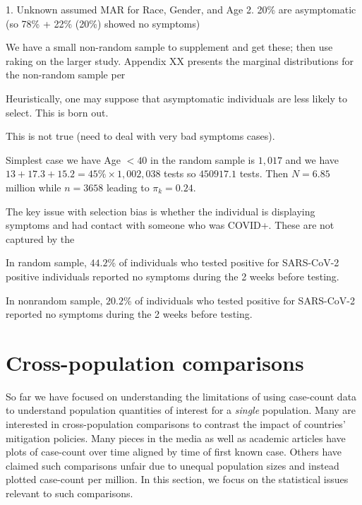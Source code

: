 \documentclass[11pt]{amsart}
\begin{document}
1. Unknown assumed MAR for Race, Gender, and Age
2. 20\% are asymptomatic (so 78\% + 22\% (20\%) showed no symptoms)


We have a small non-random sample to supplement and get these; then use raking on the larger study.  Appendix XX presents the marginal distributions for the non-random sample per

Heuristically, one may suppose that asymptomatic individuals are less likely to select.  This is born out.

This is not true (need to deal with very bad symptoms cases).

Simplest case we have Age $<40$ in the random sample is $1,017$ and we have $13+17.3+15.2 = 45\% \times 1,002,038$ tests so $450917.1$ tests. Then $N = 6.85$ million while $n = 3658$ leading to $\pi_k = 0.24$.


\begin{rmk}
The key issue with selection bias is whether the individual is displaying symptoms and had contact with someone who was COVID+.  These are not captured by the

In random sample, $44.2$\% of individuals who tested positive for SARS-CoV-2 positive individuals reported no symptoms during the 2 weeks before testing.

In nonrandom sample, $20.2$\% of individuals who tested positive for SARS-CoV-2 reported no symptoms during the 2 weeks before testing.

\end{rmk}

\begin{rmk}

\end{rmk}


\section{Cross-population comparisons}
\label{section:crosspop}
So far we have focused on understanding the limitations of using case-count data to understand population quantities of interest for a \emph{single} population.  Many are interested in cross-population comparisons to contrast the impact of countries' mitigation policies.  Many pieces in the media as well as academic articles have plots of case-count over time aligned by time of first known case.  Others have claimed such comparisons unfair due to unequal population sizes and instead plotted case-count per million.  In this section, we focus on the statistical issues relevant to such comparisons.
\end{document}
